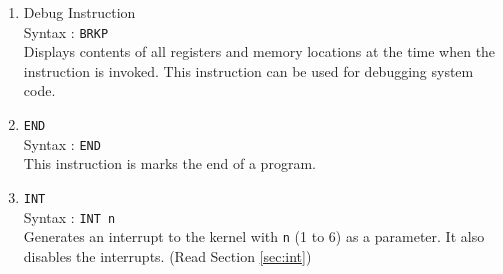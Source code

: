 \documentclass[11pt]{report}
\begin{document}
\begin{enumerate}
\item Debug Instruction\\
Syntax : \texttt{BRKP}\\
Displays contents of all registers and memory locations at the time when the instruction is invoked. This instruction can be used for debugging system code.


\item \texttt{END}\\
Syntax : \texttt{END}\\
This instruction is marks the end of a program.

\item \texttt{INT}\\
Syntax : \texttt{INT n}\\
Generates an interrupt to the kernel with \texttt{n} (1 to 6) as a parameter. It also disables the interrupts. (Read Section \ref{sec:int})



\end{enumerate}
\end{document}
